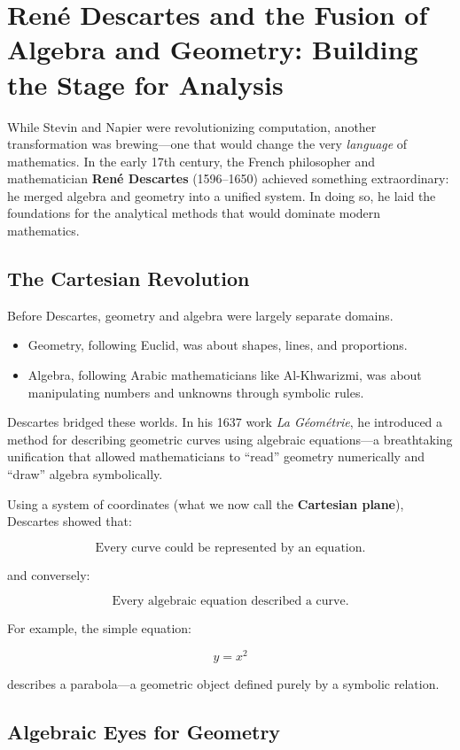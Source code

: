 \section{René Descartes and the Fusion of Algebra and Geometry: Building the Stage for Analysis}

While Stevin and Napier were revolutionizing computation, another transformation was brewing—one that would change the very \textit{language} of mathematics.  
In the early 17th century, the French philosopher and mathematician \textbf{René Descartes} (1596--1650) achieved something extraordinary: he merged algebra and geometry into a unified system. In doing so, he laid the foundations for the analytical methods that would dominate modern mathematics.

\subsection{The Cartesian Revolution}

Before Descartes, geometry and algebra were largely separate domains.

\begin{itemize}
    \item Geometry, following Euclid, was about shapes, lines, and proportions.
    \item Algebra, following Arabic mathematicians like Al-Khwarizmi, was about manipulating numbers and unknowns through symbolic rules.
\end{itemize}

Descartes bridged these worlds. In his 1637 work \textit{La Géométrie}, he introduced a method for describing geometric curves using algebraic equations—a breathtaking unification that allowed mathematicians to ``read'' geometry numerically and ``draw'' algebra symbolically.

Using a system of coordinates (what we now call the \textbf{Cartesian plane}), Descartes showed that:

\[
\text{Every curve could be represented by an equation.}
\]

and conversely:

\[
\text{Every algebraic equation described a curve.}
\]

For example, the simple equation:

\[
y = x^2
\]

describes a parabola—a geometric object defined purely by a symbolic relation.

\subsection{Algebraic Eyes for Geometry}

